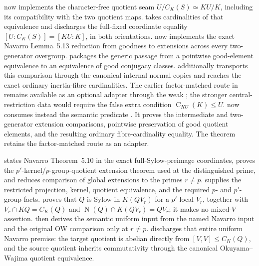 \documentclass[11pt]{article}
\newcommand{\Norm}{\operatorname{N}}
\newcommand{\Cent}{\operatorname{C}}
\begin{document}
 now implements the
character-free quotient seam \(U/C_K(S)\simeq KU/K\), including its
compatibility with the two quotient maps.
 takes cardinalities of
that equivalence and discharges the full-fixed coordinate equality
\([U:C_K(S)]=[KU:K]\), in both orientations.
 now implements the exact
Navarro Lemma~5.13 reduction from goodness to extensions across every
two-generator overgroup.
 packages the generic passage from a
pointwise good-element equivalence to an equivalence of good conjugacy
classes.   additionally transports this
comparison through the canonical internal normal copies and reaches the
exact ordinary inertia-fibre cardinalities.  The earlier factor-matched
route in  remains available as
an optional adapter through the weak
; the stronger
central-restriction data would require the false extra condition
\(\Cent_{KU}(K)\leq U\).
 now consumes instead the semantic
predicate .  It proves the
intermediate and two-generator extension comparisons, pointwise
preservation of good quotient elements, and the resulting ordinary
fibre-cardinality equality.  The theorem
 retains
the factor-matched route as an adapter.

 states Navarro
Theorem~5.10 in the exact full-Sylow-preimage coordinates, proves the
\(p'\)-kernel/\(p\)-group-quotient extension theorem used at the
distinguished prime, and reduces comparison of global extensions to the
primes \(r\ne p\).
 supplies the restricted
projection, kernel, quotient equivalence, and the required \(p\)- and
\(p'\)-group facts.
 proves that \(Q\) is Sylow
in \(K(QV_r)\) for a \(p'\)-local \(V_r\), together with
\(V_r\cap KQ=C_K(Q)\) and
\(\Norm(Q)\cap K(QV_r)=QV_r\); it makes no mixed-\(V\) assertion.
 then derives the semantic
uniform input from the named Navarro input and the original OW comparison
only at \(r\ne p\).
 discharges that entire
uniform Navarro premise: the target quotient is abelian directly from
\([V,V]\le C_K(Q)\), and the source quotient inherits commutativity through
the canonical Okuyama--Wajima quotient equivalence.
\end{document}

